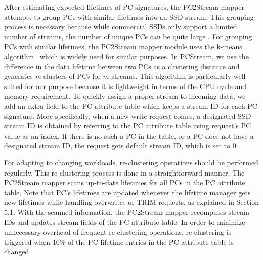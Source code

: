 After estimating expected lifetimes of PC signatures, the PC2Stream mapper
attempts to group PCs with similar lifetimes into an SSD stream.  This grouping
process is necessary because while commercial SSDs only support a limited
number of streams, the number of unique PCs can be quite large .  For grouping PCs with similar lifetimes, the PC2Stream mapper module
uses the k-means algorithm~\cite{kmeans} which is widely used for similar
purposes.  In \textsf{\small PCStream}, we use the difference in the data
lifetime between two PCs as a clustering distance and  generates {\it m}
clusters of PCs for $m$ streams.  This algorithm is particularly well suited
for our purpose because it is lightweight in terms of the CPU cycle and
memory requirement.  To quickly assign a proper stream to incoming data, we add
an extra field to the PC attribute table which keeps a stream ID for each PC
signature.  More specifically, when a new write request comes, a designated SSD
stream ID is obtained by referring to the PC attribute table using request's PC
value as an index.  If there is no such a PC in the table, or a PC does not
have a designated stream ID, the request gets default stream ID, which is set
to 0.

For adapting to changing workloads, re-clustering operations should be
performed regularly. This re-clustering process is done in a straightforward
manner. The PC2Stream mapper scans up-to-date lifetimes for all PCs in the PC
attribute table. Note that PC's lifetimes are updated whenever the lifetime
manager gets new lifetimes while handling overwrites or TRIM requests, as
explained in Section 5.1.  With the scanned information, the PC2Stream mapper
recomputes stream IDs and updates stream fields of the PC attribute table.  In
order to minimize unnecessary overhead of frequent re-clustering operations,
re-clustering is triggered when 10\% of the PC lifetime entries in the PC
attribute table is changed.


\vspace{-10pt}
